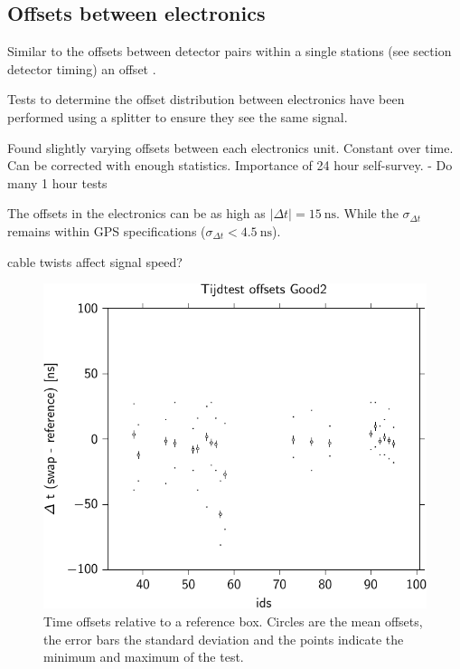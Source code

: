 \subsection{Offsets between \hisparc electronics}
\label{sub:gps_offsets}

Similar to the offsets between detector pairs within a single stations (see section detector timing) an offset .

Tests to determine the offset distribution between \hisparc electronics have been performed using a \gps splitter to ensure they see the same \gps signal.

Found slightly varying offsets between each \hisparc electronics unit. Constant over time. Can be corrected with enough statistics. Importance of 24 hour self-survey. - Do many 1 hour tests


The offsets in the \hisparc electronics can be as high as $|\Delta t| = \SI{15}{\ns}$. While the $\sigma_{\Delta t}$ remains within GPS specifications ($\sigma_{\Delta t} < \SI{4.5}{\ns}$).


\gps cable twists affect signal speed?

\begin{figure}
    \centering
    \includegraphics{plots/cluster/hisparc_offsets}
    \caption{Time offsets relative to a reference box. Circles are the
             mean offsets, the error bars the standard deviation and the
             points indicate the minimum and maximum of the test.}
    \label{fig:hisparc_offsets}
\end{figure}


